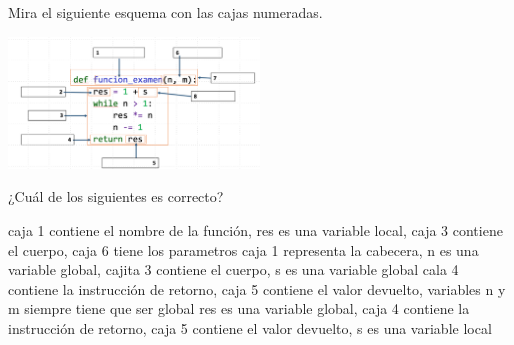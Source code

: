 \begin{ejercicio} Mira el siguiente esquema con las cajas numeradas.

\includegraphics[width=0.5\textwidth]{book/Spanish/05_Funciones/images/funcion.png}

¿Cuál de los siguientes es correcto?

\begin{choices}
    \choice caja 1 contiene el nombre de la función, res es una variable local, caja 3 contiene el cuerpo, caja 6 tiene los parametros   %
    \choice caja 1 representa la cabecera, n es una variable global, cajita 3 contiene el cuerpo, s es una variable global
    \choice cala 4 contiene la instrucción de retorno, caja 5 contiene el valor devuelto, variables n y m siempre tiene que ser global  
    \choice res es una variable global, caja 4 contiene la instrucción de retorno, caja 5 contiene el valor devuelto, s es una variable local

\end{choices}
\end{ejercicio}

